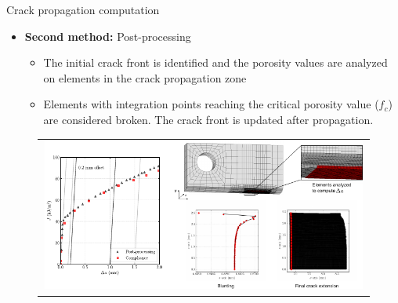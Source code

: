 \documentclass[9pt]{beamer}
\begin{document}
\begin{frame}{Crack propagation computation}

\begin{itemize}
	\item \textbf{Second method:} Post-processing
	\vspace{0.15cm}
	\begin{itemize}
	\item The initial crack front is identified and the porosity values are analyzed on elements in the crack propagation zone
	\vspace{0.15cm}
	\item Elements with integration points reaching the critical porosity value ($f_c$) are considered broken. The crack front is updated after propagation.
	\end{itemize}
\end{itemize}

\begin{figure}
        \begin{tabular}{c}
            \includegraphics[width=0.99\textwidth]{Images/post_processing_technique.pdf} \\
        \end{tabular}
    \end{figure}

\end{frame}

\end{document}
